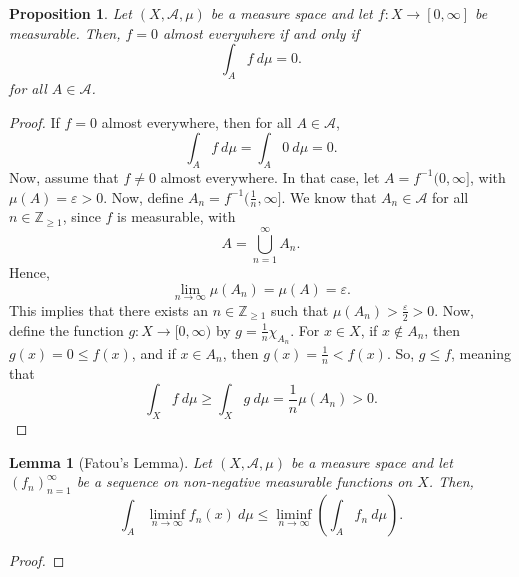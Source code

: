 \documentclass[a4paper, openany]{memoir}
\theoremstyle{definition}
\theoremstyle{plain}
\newtheorem{lemma}[definition]{Lemma}
\newtheorem{proposition}[definition]{Proposition}
\begin{document}
    \begin{proposition}
        Let $(X, \mathcal{A}, \mu)$ be a measure space and let $f \colon X \to [0, \infty]$ be measurable. Then, $f = 0$ almost everywhere if and only if
        \[\int_A f \ d\mu = 0.\]
        for all $A \in \mathcal{A}$.
    \end{proposition}
    \begin{proof}
        If $f = 0$ almost everywhere, then for all $A \in \mathcal{A}$,
        \[\int_A f \ d\mu = \int_A 0 \ d\mu = 0.\]
        Now, assume that $f \neq 0$ almost everywhere. In that case, let $A = f^{-1}(0, \infty]$, with $\mu(A) = \varepsilon > 0$. Now, define $A_n = f^{-1}(\frac{1}{n}, \infty]$. We know that $A_n \in \mathcal{A}$ for all $n \in \mathbb{Z}_{\geq 1}$, since $f$ is measurable, with
        \[A = \bigcup_{n=1}^\infty A_n.\]
        Hence,
        \[\lim_{n \to \infty} \mu(A_n) = \mu(A) = \varepsilon.\]
        This implies that there exists an $n \in \mathbb{Z}_{\geq 1}$ such that $\mu(A_n) > \frac{\varepsilon}{2} > 0$. Now, define the function $g \colon X \to [0, \infty)$ by $g = \frac{1}{n} \chi_{A_n}$. For $x \in X$, if $x \not\in A_n$, then $g(x) = 0 \leq f(x)$, and if $x \in A_n$, then $g(x) = \frac{1}{n} < f(x)$. So, $g \leq f$, meaning that
        \[\int_X f \ d\mu \geq \int_X g \ d\mu = \frac{1}{n} \mu(A_n) > 0.\]
    \end{proof}

    \begin{lemma}[Fatou's Lemma]
        Let $(X, \mathcal{A}, \mu)$ be a measure space and let $(f_n)_{n=1}^\infty$ be a sequence on non-negative measurable functions on $X$. Then,
        \[\int_A \liminf_{n \to \infty} f_n(x) \ d\mu \leq \liminf_{n \to \infty} \left(\int_A f_n \ d\mu\right).\]
    \end{lemma}
    \begin{proof}
        
    \end{proof}
\end{document}

